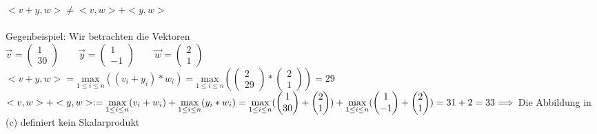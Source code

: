\documentclass[a4paper,10pt]{article}
\begin{document}
\begin{compactenum} [(a)]
		\item $ <v+y,w> \neq <v,w> + <y,w> $\\\\
		Gegenbeispiel: Wir betrachten die Vektoren\\
		$ \vec{v} = \begin{pmatrix}
		1 \\ 30
		\end{pmatrix} \qquad
		\vec{y} = \begin{pmatrix}
		1 \\ -1
		\end{pmatrix} \qquad
		\vec{w} = \begin{pmatrix}
		2 \\ 1
		\end{pmatrix}$\\
		$ <v+y,w> = \underset{1 \leq i \leq n}{\text{max}} (
			(v_i+y_i) * w_i) = \underset{1 \leq i \leq n}{\text{max}} (\begin{pmatrix} 2 \\ 29 \end{pmatrix} * 
			\begin{pmatrix} 2 \\ 1 \end{pmatrix}) = 29 $ \\
		$ <v,w> + <y,w> := \underset{1 \leq i \leq n}{\text{max}} (v_i + w_i) + \underset{1 \leq i \leq n}{\text{max}} (y_i * w_i) = 
		\underset{1 \leq i \leq n}{\text{max}} (
		\begin{pmatrix}
		1 \\ 30
		\end{pmatrix} + 
		\begin{pmatrix}
		2 \\ 1
		\end{pmatrix}) + \underset{1 \leq i \leq n}{\text{max}} (
		\begin{pmatrix}
		1 \\ -1
		\end{pmatrix} + 
		\begin{pmatrix}
		2 \\ 1
		\end{pmatrix} )\\
		= 31 + 2 = 33 \\
		\Longrightarrow $ Die Abbildung in (c) definiert kein Skalarprodukt
		
	\end{compactenum} \
	
\end{document}
